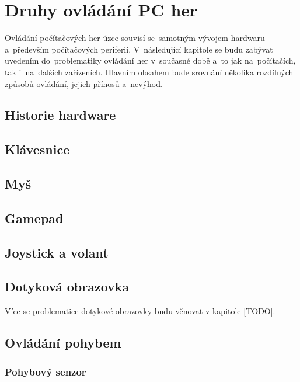 \documentclass[thesis=B,czech,hidelinks]{FITthesis}[2012/06/26] %
\begin{document}
\chapter{Druhy ovládání PC her}

Ovládání počítačových her úzce souvisí se~samotným vývojem hardwaru a~především počítačových periferií. V~následující kapitole se budu zabývat uvedením do~problematiky ovládání her v~současné době a~to jak na~počítačích, tak i~na~dalších zařízeních. Hlavním obsahem bude srovnání několika rozdílných způsobů ovládání, jejich přínosů a~nevýhod. 


\section{Historie hardware}

\section{Klávesnice}

\section{Myš}

\section{Gamepad}

\section{Joystick a volant}

\section{Dotyková obrazovka}

Více se problematice dotykové obrazovky budu věnovat v kapitole [TODO].

\section{Ovládání pohybem}

\subsection{Pohybový senzor}
\end{document}
